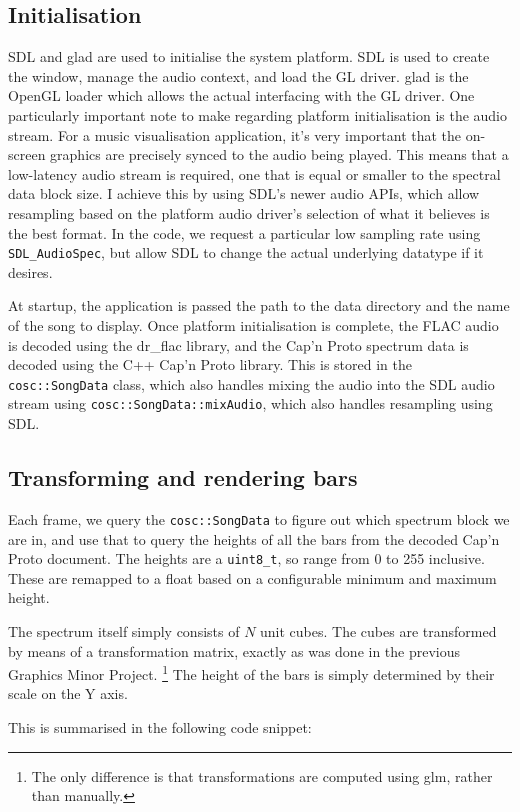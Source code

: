 \documentclass[11pt]{article}
\begin{document}
\subsection{Initialisation}
SDL and glad are used to initialise the system platform. SDL is used to create the window, manage the audio
context, and load the GL driver. glad is the OpenGL loader which allows the actual interfacing with the GL
driver. One particularly important note to make regarding platform initialisation is the audio stream. For a
music visualisation application, it's very important that the on-screen graphics are precisely synced to the
audio being played. This means that a low-latency audio stream is required, one that is equal or smaller to
the spectral data block size. I achieve this by using SDL's newer audio APIs, which allow resampling based on
the platform audio driver's selection of what it believes is the best format. In the code, we request a
particular low sampling rate using \verb|SDL_AudioSpec|, but allow SDL to change the actual underlying
datatype if it desires.

At startup, the application is passed the path to the data directory and the name of the song to display. Once
platform initialisation is complete, the FLAC audio is decoded using the dr\_flac library, and the Cap'n Proto
spectrum data is decoded using the C++ Cap'n Proto library. This is stored in the \verb|cosc::SongData| class,
which also handles mixing the audio into the SDL audio stream using \verb|cosc::SongData::mixAudio|, which
also handles resampling using SDL.

\subsection{Transforming and rendering bars}
Each frame, we query the \verb|cosc::SongData| to figure out which spectrum block we are in, and use that to
query the heights of all the bars from the decoded Cap'n Proto document. The heights are a \verb|uint8_t|, so
range from 0 to 255 inclusive. These are remapped to a float based on a configurable minimum and maximum
height.

The spectrum itself simply consists of $N$ unit cubes. The cubes are transformed by means of a transformation
matrix, exactly as was done in the previous Graphics Minor Project. \footnote{The only difference is that
transformations are computed using glm, rather than manually.} The height of the bars is simply determined by
their scale on the Y axis.

This is summarised in the following code snippet:
\end{document}
